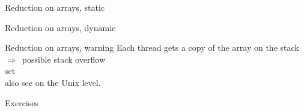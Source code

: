 \begin{numberedframe}{Reduction on arrays, static}
\end{numberedframe}

\begin{numberedframe}{Reduction on arrays, dynamic}
\end{numberedframe}

\begin{numberedframe}{Reduction on arrays, warning}
  Each thread gets a copy of the array on the stack\\
  $\Rightarrow$~possible stack overflow\\
  set \\
  also see  on the Unix level.
\end{numberedframe}

 {Exercises}

\begin{exerciseframe}[jacobi]
  
\end{exerciseframe}

\begin{exerciseframe}
  
\end{exerciseframe}

\begin{exerciseframe}
  
\end{exerciseframe}

\begin{exerciseframe}
  
\end{exerciseframe}

\endinput

\begin{numberedframe}{}
\begin{lstlisting}
\end{lstlisting}
  \begin{itemize}
  \item 
  \end{itemize}
\end{numberedframe}

